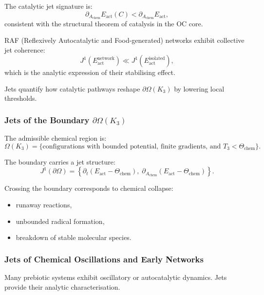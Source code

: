 The catalytic jet signature is:
\[
\partial_{A_{\mathrm{chem}}}E_{\mathrm{act}}(C)
<
\partial_{A_{\mathrm{chem}}}E_{\mathrm{act}},
\]
consistent with the structural theorem of catalysis in the OC core.

RAF (Reflexively Autocatalytic and Food-generated) networks exhibit
collective jet coherence:
\[
J^1(E_{\mathrm{act}}^{\mathrm{network}}) 
\ll 
J^1(E_{\mathrm{act}}^{\mathrm{isolated}}),
\]
which is the analytic expression of their stabilising effect.

Jets quantify how catalytic pathways reshape $\partial\Omega(K_3)$ by
lowering local thresholds.



\subsubsection{Jets of the Boundary \texorpdfstring{\texorpdfstring{$\partial\Omega(K_3)$}{\partial\Omega(K_3)}}{Boundary}}

The admissible chemical region is:
\[
\Omega(K_3)=
\{
\text{configurations with bounded potential, finite gradients, and }
T_3 < \Theta_{\mathrm{chem}}
\}.
\]

The boundary carries a jet structure:
\[
J^1(\partial\Omega)=
\left\{
\partial_t(E_{\mathrm{act}}-\Theta_{\mathrm{chem}}),\;
\partial_{A_{\mathrm{chem}}}(E_{\mathrm{act}}-\Theta_{\mathrm{chem}})
\right\}.
\]

Crossing the boundary corresponds to chemical collapse:

\begin{itemize}
    \item runaway reactions,
    \item unbounded radical formation,
    \item breakdown of stable molecular species.
\end{itemize}



\subsubsection{Jets of Chemical Oscillations and Early Networks}

Many prebiotic systems exhibit oscillatory or autocatalytic dynamics.
Jets provide their analytic characterisation.

